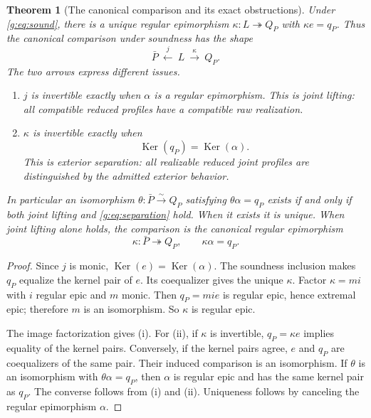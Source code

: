 \documentclass[11pt]{article}
\newtheorem{theorem}{Theorem}[section]
\theoremstyle{definition}
\theoremstyle{remark}\newtheorem{remark}[theorem]{Remark}
\newcommand{\Ker}{\operatorname{Ker}}
\begin{document}
\begin{theorem}[The canonical comparison and its exact obstructions]
\label{g:thm:comparison}
Under \eqref{g:eq:sound}, there is a unique regular epimorphism
$\kappa:L\twoheadrightarrow Q_P$ with $\kappa e=q_P$. Thus the
canonical comparison under soundness has the shape
\begin{equation}\label{g:eq:span}
 \boxed{\quad \bar P\ \xleftarrow{\ j\ }\ L
                   \ \xrightarrow{\ \kappa\ }\ Q_P.\quad}
\end{equation}
The two arrows express different issues.
\begin{enumerate}[label=(\roman*)]
\item $j$ is invertible exactly when $\alpha$ is a regular epimorphism.
This is \emph{joint lifting}: all compatible reduced profiles have a
compatible raw realization.
\item $\kappa$ is invertible exactly when
\begin{equation}\label{g:eq:separation}
 \Ker(q_P)=\Ker(\alpha).
\end{equation}
This is \emph{exterior separation}: all realizable reduced joint profiles
are distinguished by the admitted exterior behavior.
\end{enumerate}
In particular an isomorphism $\theta:\bar P\xrightarrow{\sim}Q_P$
satisfying $\theta\alpha=q_P$ exists if and only if both joint lifting and
\eqref{g:eq:separation} hold. When it exists it is unique. When joint lifting
alone holds, the comparison is the canonical regular epimorphism
\begin{equation}\label{g:eq:fixed-comparison}
 \kappa:\bar P\twoheadrightarrow Q_P,
 \qquad \kappa\alpha=q_P.
\end{equation}
\end{theorem}
\begin{proof}
Since $j$ is monic, $\Ker(e)=\Ker(\alpha)$. The soundness inclusion
makes $q_P$ equalize the kernel pair of $e$. Its coequalizer gives the
unique $\kappa$. Factor $\kappa=mi$ with $i$ regular epic and $m$ monic.
Then $q_P=mie$ is regular epic, hence extremal epic; therefore $m$ is an
isomorphism. So $\kappa$ is regular epic.

The image factorization gives (i). For (ii), if $\kappa$ is invertible,
$q_P=\kappa e$ implies equality of the kernel pairs. Conversely, if the
kernel pairs agree, $e$ and $q_P$ are coequalizers of the same pair.
Their induced comparison is an isomorphism. If $\theta$ is an
isomorphism with $\theta\alpha=q_P$, then $\alpha$ is regular epic and
has the same kernel pair as $q_P$. The converse follows from (i) and (ii).
Uniqueness follows by canceling the regular epimorphism $\alpha$.
\end{proof}
\end{document}
